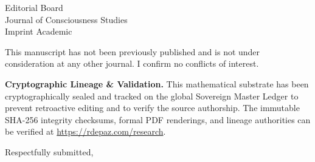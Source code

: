 \documentclass[12pt, a4paper]{letter}
\begin{document}
\begin{letter}{Editorial Board \\ Journal of Consciousness Studies \\ Imprint Academic}
\medskip

This manuscript has not been previously published and is not under consideration
at any other journal. I confirm no conflicts of interest.

\textbf{Cryptographic Lineage \& Validation.} This mathematical substrate has been cryptographically sealed and tracked on the global Sovereign Master Ledger to prevent retroactive editing and to verify the source authorship. The immutable SHA-256 integrity checksums, formal PDF renderings, and lineage authorities can be verified at \url{https://rdepaz.com/research}.

\medskip

\closing{Respectfully submitted,}
\end{letter}
\end{document}
